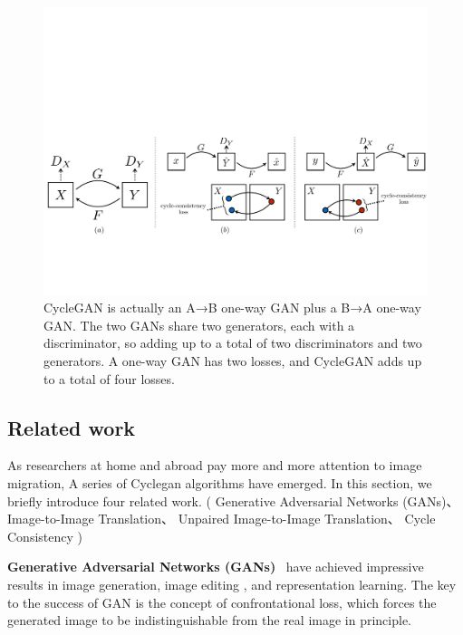 \documentclass[10pt,twocolumn,letterpaper]{article}
\begin{document}
\begin{figure}
\begin{center}
   \includegraphics[width=0.9\linewidth]{system_diagram_v2.pdf}
\end{center}
   \caption{CycleGAN is actually an A→B one-way GAN plus a B→A one-way GAN. The two GANs share two generators, each with a discriminator, so adding up to a total of two discriminators and two generators. A one-way GAN has two losses, and CycleGAN adds up to a total of four losses.}
\label{fig:one}
\label{fig:onecl}
\end{figure}



\subsection{Related work}

As researchers at home and abroad pay more and more attention to image migration,
A series of Cyclegan algorithms have emerged.
In this section, we briefly introduce four related work.
( Generative Adversarial Networks (GANs)、
Image-to-Image Translation、
Unpaired Image-to-Image Translation、
Cycle Consistency )

{\bf Generative Adversarial Networks (GANs)}~\cite{GAN,GAN1}
have achieved impressive results in image generation\cite{imagegen,imagegen1},
image editing \cite{imgaeedi}, 
and representation learning\cite{imagegen1,replearn}.
The key to the success of GAN is 
the concept of confrontational loss, 
which forces the generated image to be 
indistinguishable from the real image in principle.
\end{document}
